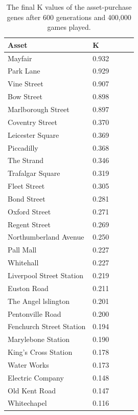 \documentclass[11pt,a4paper,twocolumn]{scrartcl}
\begin{document}
\begin{table}
\normalsize
\centering
{}
\begin{tabular}{*5l}    
\toprule
\textbf{Asset} & \textbf{K} \\ 
\midrule
Mayfair					 & 0.932 \\
Park Lane                & 0.929 \\
Vine Street              & 0.907 \\
Bow Street               & 0.898 \\
Marlborough Street       & 0.897 \\
Coventry Street          & 0.370 \\
Leicester Square         & 0.369 \\
Piccadilly               & 0.368 \\
The Strand               & 0.346 \\
Trafalgar Square         & 0.319 \\
Fleet Street             & 0.305 \\
Bond Street              & 0.281 \\
Oxford Street            & 0.271 \\
Regent Street            & 0.269 \\
Northumberland Avenue    & 0.250 \\
Pall Mall                & 0.227 \\
Whitehall                & 0.227 \\
Liverpool Street Station & 0.219 \\
Euston Road              & 0.211 \\
The Angel lslington      & 0.201 \\
Pentonville Road         & 0.200 \\
Fenchurch Street Station & 0.194 \\
Marylebone Station       & 0.190 \\
King's Cross Station     & 0.178 \\
Water Works              & 0.173 \\
Electric Company         & 0.148 \\
Old Kent Road            & 0.147 \\
Whitechapel              & 0.116 \\
\bottomrule
 \hline
\end{tabular}
\caption{The final K values of the asset-purchase genes after 600 generations and 400,000 games played.}
\label{tab:res1}
\end{table}
\end{document}
